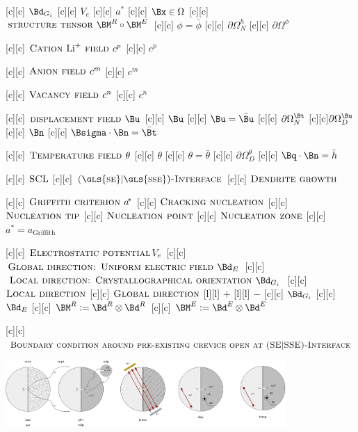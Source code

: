 [c][c] {$\Bd_{G_{i}}$}
[c][c] {$V_{e}$}
[c][c]   {\scriptsize $a^{\!\ast}$}
[c][c] {$\Bx \in \Omega$}
[c][c] {$\textsc{structure tensor } \BM^{R} \circ \BM^{E}$}
[c][c] {$\phi=\bar{\phi}$}
[c][c] {$\partial\Omega^{h}_{N}$}
[c][c] {$\partial\Omega^{\phi}$}

[c][c]  {\scriptsize $\textsc{Cation } \text{Li}^{+}
		\textsc{ field }  c^{p}$}
[c][c]  {$c^{p}$}

[c][c] {\scriptsize $\textsc{Anion field } c^{m}$}
[c][c]  {$c^{m}$}

[c][c]   {\scriptsize $\textsc{Vacancy field } c^{n}$}
[c][c]  {$c^{n}$}

[c][c] {\scriptsize $\textsc{displacement field } \Bu$}
[c][c]   {$\Bu$}
[c][c] {$\Bu=\bar{\Bu}$}
[c][c]  {$\partial\Omega^{\Bt}_{N}$}
[c][c]{$\partial\Omega^{\Bu}_{D}$}
[c][c]    {$\Bn$}
[c][c] {$\Bsigma\cdot\Bn = \bar{\Bt}$}

[c][c]  {\scriptsize $\textsc{Temperature field } \theta$}
[c][c]    {$\theta$}
[c][c] {$\theta = \bar{\theta}$}
[c][c]  {$\partial\Omega^{\theta}_{D}$}
[c][c]  {$\Bq\cdot\Bn = \bar{h}$}

[c][c] {\scriptsize $\textsc{SCL}$}
[c][c]  {\tiny $\textsc{(\gls{se}$|$\gls{sse})-Interface}$}
[c][c] {\tiny $\textsc{Dendrite growth}$}

[c][c] {\scriptsize $\textsc{Griffith criterion } a^{\!\ast}$}
[c][c] {\tiny $\textsc{Cracking nucleation}$}
[c][c] {\tiny $\textsc{Nucleation tip}$}
[c][c] {\tiny $\textsc{Nucleation point}$}
[c][c] {\tiny $\textsc{Nucleation zone}$}
[c][c] {\tiny $a^{\!\ast}\!\!=\!a_{\text{Griffith}}$}

[c][c] {\scriptsize $\textsc{Electrostatic potential}\, V_{e}$}
[c][c] {\tiny $\textsc{Global direction: Uniform electric field } \Bd_{E}$}
[c][c] {\tiny $\textsc{Local direction:  Crystallographical orientation } \Bd_{G_{i}}$}
[c][c] {\tiny $\textsc{Local direction}$}
[c][c] {\tiny $\textsc{Global direction}$}
[l][l] {$+$}
[l][l] {$-$}
[c][c] {\tiny $\Bd_{G_{i}}$}
[c][c] {\tiny $\Bd_{E}$}
[c][c] {$\BM^{R} := \Bd^{R} \otimes \Bd^{R}$}
[c][c] {$\BM^{E} := \Bd^{E} \otimes \Bd^{E}$}

[c][c]   {\scriptsize $\textsc{Boundary condition around pre-existing crevice open at (SE$|$SSE)-Interface}$}

\includegraphics[width=0.8\textwidth]{structuralfivefields_multi_edited.eps}